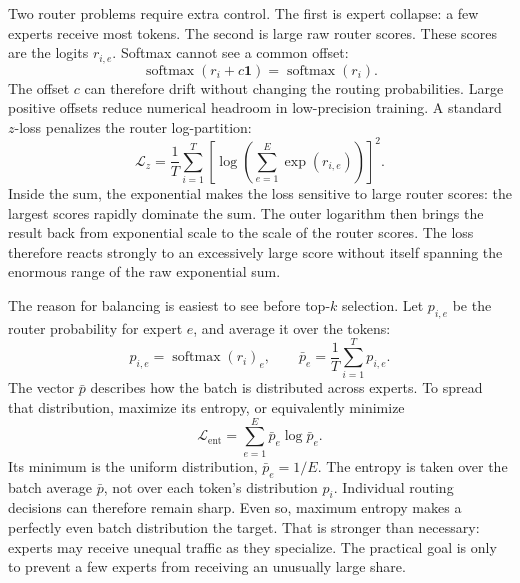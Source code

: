 \documentclass[11pt]{article}
\newcommand{\softmax}{\operatorname{softmax}}
\begin{document}
Two router problems require extra control.  The first is expert collapse: a few
experts receive most tokens.  The second is large raw router scores.  These
scores are the logits $r_{i,e}$.  Softmax cannot see a common offset:
\[
  \softmax(r_i+c\mathbf{1})=\softmax(r_i).
\]
The offset $c$ can therefore drift without changing the routing probabilities.
Large positive offsets reduce numerical headroom in low-precision training.  A
standard $z$-loss penalizes the router log-partition:
\begin{equation}
  \mathcal{L}_z
  =\frac{1}{T}\sum_{i=1}^{T}
    \left[\log\!\left(\sum_{e=1}^{E}\exp(r_{i,e})\right)\right]^2.
  \label{eq:moe-z-loss}
\end{equation}
Inside the sum, the exponential makes the loss sensitive to large router
scores: the largest scores rapidly dominate the sum.  The outer logarithm then
brings the result back from exponential scale to the scale of the router
scores.  The loss therefore reacts strongly to an excessively large score
without itself spanning the enormous range of the raw exponential sum.

The reason for balancing is easiest to see before top-$k$ selection.  Let
$p_{i,e}$ be the router probability for expert $e$, and average it over the
tokens:
\begin{equation}
  p_{i,e}=\softmax(r_i)_e,
  \qquad
  \bar p_e=\frac{1}{T}\sum_{i=1}^{T}p_{i,e}.
  \label{eq:moe-mean-router-probability}
\end{equation}
The vector $\bar p$ describes how the batch is distributed across experts.  To
spread that distribution, maximize its entropy, or equivalently minimize
\begin{equation}
  \mathcal{L}_{\mathrm{ent}}
  =\sum_{e=1}^{E}\bar p_e\log \bar p_e.
  \label{eq:moe-routing-entropy}
\end{equation}
Its minimum is the uniform distribution, $\bar p_e=1/E$.  The entropy is taken
over the batch average $\bar p$, not over each token's distribution $p_i$.
Individual routing decisions can therefore remain sharp.  Even so, maximum
entropy makes a perfectly even batch distribution the target.  That is stronger
than necessary: experts may receive unequal traffic as they specialize.  The
practical goal is only to prevent a few experts from receiving an unusually
large share.
\end{document}
